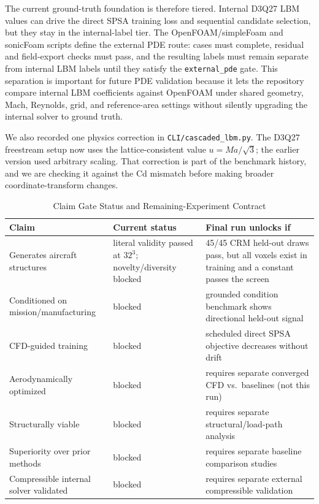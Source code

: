 The current ground-truth foundation is therefore tiered. Internal D3Q27 LBM values can drive the direct SPSA training loss and sequential candidate selection, but they stay in the internal-label tier. The OpenFOAM/simpleFoam and sonicFoam scripts define the external PDE route: cases must complete, residual and field-export checks must pass, and the resulting labels must remain separate from internal LBM labels until they satisfy the \texttt{external\_pde} gate. This separation is important for future PDE validation because it lets the repository compare internal LBM coefficients against OpenFOAM under shared geometry, Mach, Reynolds, grid, and reference-area settings without silently upgrading the internal solver to ground truth.

We also recorded one physics correction in \texttt{CLI/cascaded\_lbm.py}. The D3Q27 freestream setup now uses the lattice-consistent value \(u = Ma / \sqrt{3}\); the earlier version used arbitrary scaling. That correction is part of the benchmark history, and we are checking it against the Cd mismatch before making broader coordinate-transform changes.

\begin{table}[!t]
\centering
\caption{Claim Gate Status and Remaining-Experiment Contract}
\label{tab:claim_gates}
\footnotesize
\setlength{\tabcolsep}{2pt}
\begin{tabular}{|p{}|p{}|p{}|}
\hline
\textbf{Claim} & \textbf{Current status} & \textbf{Final run unlocks if} \\ \hline
Generates aircraft structures & literal validity passed at \(32^3\); novelty/diversity blocked & 45/45 CRM held-out draws pass, but all voxels exist in training and a constant passes the screen \\ \hline
Conditioned on mission/manufacturing & blocked & grounded condition benchmark shows directional held-out signal \\ \hline
CFD-guided training & blocked & scheduled direct SPSA objective decreases without drift \\ \hline
Aerodynamically optimized & blocked & requires separate converged CFD vs.\ baselines (not this run) \\ \hline
Structurally viable & blocked & requires separate structural/load-path analysis \\ \hline
Superiority over prior methods & blocked & requires separate baseline comparison studies \\ \hline
Compressible internal solver validated & blocked & requires separate external compressible validation \\ \hline
\end{tabular}
\end{table}

